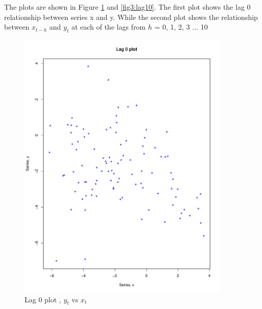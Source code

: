 \documentclass{article}
\begin{document}
The plots are shown in Figure \ref{fig2:normalplot} and \ref{fig3:lag10}. The first plot shows the lag 0 relationship between series x and y. While the second plot shows 
the relationship between $x_{t-h}$ and $y_t$ at each of the lags from $h$ = 0, 1, 2, 3 ... 10

\begin{figure}
	\centering
	\includegraphics[width=0.9\textwidth]{Lag0}
	\caption{Lag 0 plot , $y_t$ vs $x_t$}
	\label{fig2:normalplot} 
\end{figure}
\end{document}
